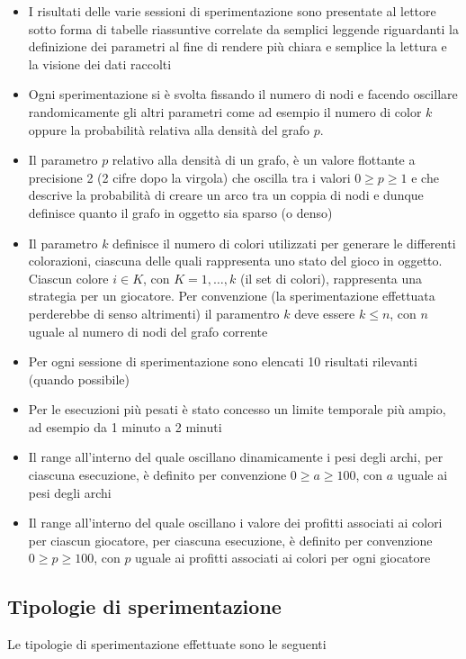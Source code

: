 \begin{itemize}
	\item I risultati delle varie sessioni di sperimentazione sono presentate al lettore sotto forma di tabelle riassuntive correlate da semplici leggende riguardanti la definizione dei parametri al fine di rendere più chiara e semplice la lettura e la visione dei dati raccolti
	\item Ogni sperimentazione si è svolta fissando il numero di nodi e facendo oscillare randomicamente gli altri parametri come ad esempio il numero di color $k$ oppure la probabilità relativa alla densità del grafo $p$.\\
	\item Il parametro $p$ relativo alla densità di un grafo, è un valore flottante a precisione 2 (2 cifre dopo la virgola) che oscilla tra i valori \(0 \geq p \geq 1\) e che descrive la probabilità di creare un arco tra un coppia di nodi e dunque definisce quanto il grafo in oggetto sia sparso (o denso)
	\item Il parametro $k$ definisce il numero di colori utilizzati per generare le differenti colorazioni, ciascuna delle quali rappresenta uno stato del gioco in oggetto. Ciascun colore \(i \in K\), con \(K = 1,\ldots,k\) (il set di colori), rappresenta una strategia per un giocatore. Per convenzione (la sperimentazione effettuata perderebbe di senso altrimenti) il paramentro $k$ deve essere \(k \leq n\), con $n$ uguale al numero di nodi del grafo corrente
	\item Per ogni sessione di sperimentazione sono elencati 10 risultati rilevanti (quando possibile)
	\item Per le esecuzioni più pesati è stato concesso un limite temporale più ampio, ad esempio da 1 minuto a 2 minuti
	\item Il range all'interno del quale oscillano dinamicamente i pesi degli archi, per ciascuna esecuzione, è definito per convenzione \(0 \geq a \geq 100\), con $a$ uguale ai pesi degli archi
	\item Il range all'interno del quale oscillano i valore dei profitti associati ai colori per ciascun giocatore, per ciascuna esecuzione, è definito per convenzione \(0 \geq p \geq 100\), con $p$ uguale ai profitti associati ai colori per ogni giocatore
\end{itemize}

\subsection{Tipologie di sperimentazione}
\justify
Le tipologie di sperimentazione effettuate sono le seguenti

